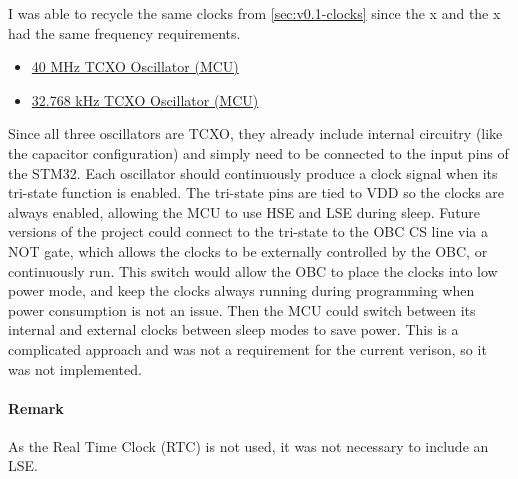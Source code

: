 I was able to recycle the same clocks from \autoref{sec:v0.1-clocks} since the x and the x had the same frequency requirements.

\begin{itemize}
    \item \href{https://www.mouser.com/ProductDetail/ECS/ECS-TXO-2016-33-400-TR?qs=PzGy0jfpSMtctR53CPxRHg%3D%3D}{40 MHz TCXO Oscillator (MCU)}
    \item \href{https://www.mouser.com/ProductDetail/ECS/ECS-327TXO-2012-33-TR?qs=amGC7iS6iy%252Bnhf6zW2Y7hQ%3D%3D}{32.768 kHz TCXO Oscillator (MCU)}
\end{itemize}

Since all three oscillators are TCXO, they already include internal circuitry (like the capacitor configuration) and simply need to be connected to the input pins of the STM32.
Each oscillator should continuously produce a clock signal when its tri-state function is enabled. The tri-state pins are tied to VDD so the clocks are always enabled, allowing the MCU to use HSE and LSE during sleep.
\nl
Future versions of the project could connect to the tri-state to the OBC CS line via a NOT gate, which allows the clocks to be externally controlled by the OBC, or continuously run. This switch would allow the OBC to place the clocks into low power mode, and keep the clocks always running during programming when power consumption is not an issue. Then the MCU could switch between its internal and external clocks between sleep modes to save power. This is a complicated approach and was not a requirement for the current verison, so it was not implemented.

\paragraph{Remark}
As the Real Time Clock (RTC) is not used, it was not necessary to include an LSE.